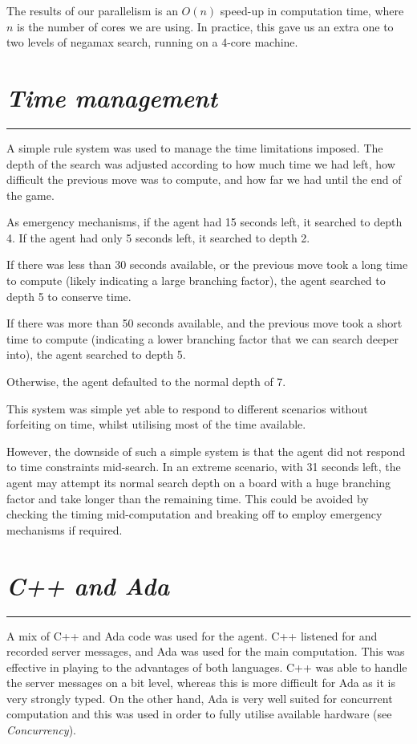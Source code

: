 \documentclass[10pt]{report}
\begin{document}
\begin{multicols}{2}
The results of our parallelism is an $O(n)$ speed-up in computation time, where $n$ is the number of cores we are using. In practice, this gave us an extra one to two levels of negamax search, running on a 4-core machine.
\section*{\emph{Time management}}
\hrule

A simple rule system was used to manage the time limitations imposed. The depth of the search was adjusted according to how much time we had left, how difficult the previous move was to compute, and how far we had until the end of the game.

As emergency mechanisms, if the agent had 15 seconds left, it searched to depth 4. If the agent had only 5 seconds left, it searched to depth 2.

If there was less than 30 seconds available, or the previous move took a long time to compute (likely indicating a large branching factor), the agent searched to depth 5 to conserve time.

If there was more than 50 seconds available, and the previous move took a short time to compute (indicating a lower branching factor that we can search deeper into), the agent searched to depth 5.

Otherwise, the agent defaulted to the normal depth of 7.

This system was simple yet able to respond to different scenarios without forfeiting on time, whilst utilising most of the time available.

However, the downside of such a simple system is that the agent did not respond to time constraints mid-search. In an extreme scenario, with 31 seconds left, the agent may attempt its normal search depth on a board with a huge branching factor and take longer than the remaining time. This could be avoided by checking the timing mid-computation and breaking off to employ emergency mechanisms if required.
\section*{\emph{C++ and Ada}}
\hrule
A mix of C++ and Ada code was used for the agent. C++ listened for and recorded server messages, and Ada was used for the main computation. This was effective in playing to the advantages of both languages. C++ was able to handle the server messages on a bit level, whereas this is more difficult for Ada as it is very strongly typed. On the other hand, Ada is very well suited for concurrent computation and this was used in order to fully utilise available hardware (see \emph{Concurrency}).


\end{multicols}
\end{document}

